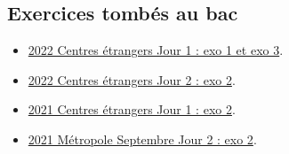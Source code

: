 \documentclass[
  a4paper,
  DIV=11,
  numbers=noendperiod]{scrartcl}
\providecommand{\tightlist}{%
  \setlength{\itemsep}{0pt}\setlength{\parskip}{0pt}}\usepackage{longtable,booktabs,array}
\begin{document}
\hypertarget{fa-solid-pencil-alt-exercices-tombuxe9s-au-bac}{%
\subsection{\texorpdfstring{ Exercices tombés au
bac}{ Exercices tombés au bac}}\label{fa-solid-pencil-alt-exercices-tombuxe9s-au-bac}}

\begin{itemize}
\tightlist
\item
  \href{../annales/2022_CentresEtrangers_1.pdf}{2022 Centres étrangers
  Jour 1 : exo 1 et exo 3}.
\item
  \href{../annales/2022_CentresEtrangers_2.pdf}{2022 Centres étrangers
  Jour 2 : exo 2}.
\item
  \href{../annales/2021_CentresEtrangers_1.pdf}{2021 Centres étrangers
  Jour 1 : exo 2}.
\item
  \href{../annales/2021_Metropole_Septembre_2.pdf}{2021 Métropole
  Septembre Jour 2 : exo 2}.
\end{itemize}
\end{document}
